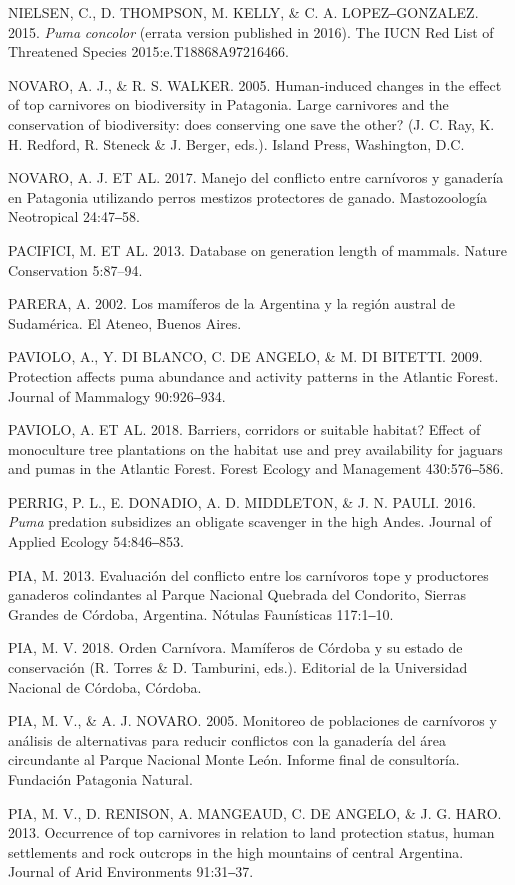 \documentclass[
  x11names]{article}
\begin{document}
NIELSEN, C., D. THOMPSON, M. KELLY, \& C. A. LOPEZ‒GONZALEZ. 2015.
\textit{Puma} \textit{concolor} (errata version published in 2016). The
IUCN Red List of Threatened Species 2015:e.T18868A97216466.

NOVARO, A. J., \& R. S. WALKER. 2005. Human-induced changes in the
effect of top carnivores on biodiversity in Patagonia. Large carnivores
and the conservation of biodiversity: does conserving one save the
other? (J. C. Ray, K. H. Redford, R. Steneck \& J. Berger, eds.). Island
Press, Washington, D.C.

NOVARO, A. J. ET AL. 2017. Manejo del conflicto entre carnívoros y
ganadería en Patagonia utilizando perros mestizos protectores de ganado.
Mastozoología Neotropical 24:47‒58.

PACIFICI, M. ET AL. 2013. Database on generation length of mammals.
Nature Conservation 5:87--94.

PARERA, A. 2002. Los mamíferos de la Argentina y la región austral de
Sudamérica. El Ateneo, Buenos Aires.

PAVIOLO, A., Y. DI BLANCO, C. DE ANGELO, \& M. DI BITETTI. 2009.
Protection affects puma abundance and activity patterns in the Atlantic
Forest. Journal of Mammalogy 90:926‒934.

PAVIOLO, A. ET AL. 2018. Barriers, corridors or suitable habitat? Effect
of monoculture tree plantations on the habitat use and prey availability
for jaguars and pumas in the Atlantic Forest. Forest Ecology and
Management 430:576‒586.

PERRIG, P. L., E. DONADIO, A. D. MIDDLETON, \& J. N. PAULI. 2016.
\textit{Puma} predation subsidizes an obligate scavenger in the high
Andes. Journal of Applied Ecology 54:846‒853.

PIA, M. 2013. Evaluación del conflicto entre los carnívoros tope y
productores ganaderos colindantes al Parque Nacional Quebrada del
Condorito, Sierras Grandes de Córdoba, Argentina. Nótulas Faunísticas
117:1‒10.

PIA, M. V. 2018. Orden Carnívora. Mamíferos de Córdoba y su estado de
conservación (R. Torres \& D. Tamburini, eds.). Editorial de la
Universidad Nacional de Córdoba, Córdoba.

PIA, M. V., \& A. J. NOVARO. 2005. Monitoreo de poblaciones de
carnívoros y análisis de alternativas para reducir conflictos con la
ganadería del área circundante al Parque Nacional Monte León. Informe
final de consultoría. Fundación Patagonia Natural.

PIA, M. V., D. RENISON, A. MANGEAUD, C. DE ANGELO, \& J. G. HARO. 2013.
Occurrence of top carnivores in relation to land protection status,
human settlements and rock outcrops in the high mountains of central
Argentina. Journal of Arid Environments 91:31‒37.
\end{document}
